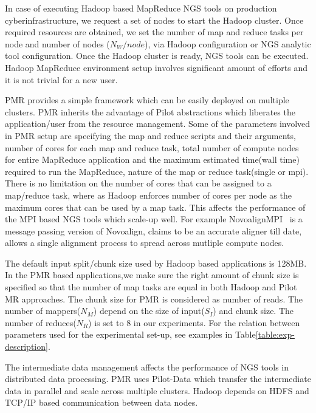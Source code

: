 \documentclass{acm_proc_article-sp}
\begin{document}
In case of executing Hadoop based MapReduce NGS tools on production cyberinfrastructure, we request a set of nodes to start the Hadoop cluster. Once 
required resources are obtained, we set the number of map and reduce tasks per node and number of nodes ($N_{W}/node$),  via Hadoop configuration or NGS analytic tool configuration.  Once the Hadoop cluster is ready, NGS tools can be executed. Hadoop MapReduce environment setup involves significant amount of efforts and it is not trivial for a new user. 

PMR provides a simple framework which can be easily deployed on multiple clusters. PMR inherits the advantage of Pilot abstractions which liberates the application/user from the resource management. Some of the parameters involved in PMR setup are specifying the map and reduce scripts and their arguments, number of cores for each map and reduce task, total number of compute nodes for entire MapReduce application and the maximum estimated time(wall time) required to run the MapReduce, nature of the map or reduce task(single or mpi). There is no limitation on the number of cores that can be assigned to a map/reduce task, where as Hadoop enforces number of cores per node as the maximum cores that can be used by a map task. This affects the performance of the MPI based NGS tools which scale-up well. For example NovoalignMPI~\cite{novo-align} is a message passing version of Novoalign, claims to be an accurate aligner till date,  allows a single alignment process to spread across mutliple compute nodes. 

The default input split/chunk size used by Hadoop based applications is 128MB. In the PMR based applications,we make sure the right amount of chunk size is specified so that the number of map tasks are equal in both Hadoop and Pilot MR approaches. The chunk size  for PMR is considered as number of reads. The number of mappers($N_M$) depend on the size of input($S_I$) and chunk size. The number of reduces($N_R$) is set to 8 in our experiments. For the relation between parameters used for the experimental set-up, see examples in Table\ref{table:exp-description}.

The intermediate data management affects the performance of NGS tools in distributed data processing. PMR uses Pilot-Data which transfer the intermediate data in parallel and scale across multiple clusters. Hadoop depends on HDFS and TCP/IP based communication between data nodes. 
\end{document}
